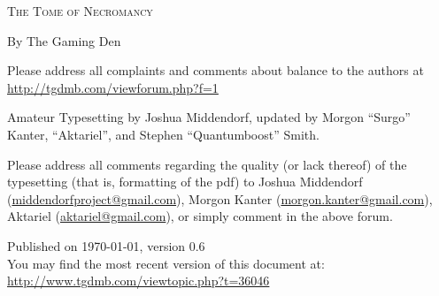 \pagestyle{plain}

\begin{center} \Huge

\textsc{The Tome of Necromancy}\end{center}



\vspace{2cm}
\begin{center}\large By The Gaming Den\end{center}


\newpage

\vspace*{4in}

\noindent Please address all complaints and comments about balance to the authors at\\
{\color{blue} \href{http://tgdmb.com/viewforum.php?f=1}{http://tgdmb.com/viewforum.php?f=1}}

\vspace{0.2in}



\noindent Amateur Typesetting by Joshua Middendorf, updated by Morgon ``Surgo'' Kanter, ``Aktariel'', and Stephen ``Quantumboost'' Smith.

\vspace{0.15in}

\noindent Please address all comments regarding the quality (or lack thereof) of the typesetting (that is, formatting of the pdf) to Joshua Middendorf (\href{mailto:middendorfproject@gmail.com}{middendorfproject@gmail.com}), Morgon Kanter (\href{mailto:morgon.kanter@gmail.com}{morgon.kanter@gmail.com}), Aktariel (\href{mailto:aktariel@gmail.com}{aktariel@gmail.com}), or simply comment in the above forum.





\vspace{1in}
\noindent Published on \today, version 0.6\\
\noindent You may find the most recent version of this document at:\\
{\color{blue} \href{http://www.tgdmb.com/viewtopic.php?t=36046}{http://www.tgdmb.com/viewtopic.php?t=36046}}

\newpage
